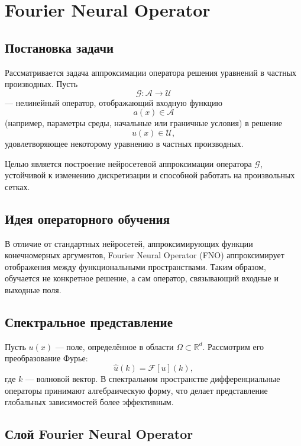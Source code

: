 \documentclass[12pt]{article}
\begin{document}
\section*{Fourier Neural Operator}

\subsection*{Постановка задачи}

Рассматривается задача аппроксимации оператора решения уравнений в частных производных. Пусть
\[
\mathcal{G} : \mathcal{A} \to \mathcal{U}
\]
— нелинейный оператор, отображающий входную функцию
\[
a(x) \in \mathcal{A}
\]
(например, параметры среды, начальные или граничные условия)
в решение
\[
u(x) \in \mathcal{U},
\]
удовлетворяющее некоторому уравнению в частных производных.

Целью является построение нейросетевой аппроксимации оператора $\mathcal{G}$, устойчивой к изменению дискретизации и способной работать на произвольных сетках.

\subsection*{Идея операторного обучения}

В отличие от стандартных нейросетей, аппроксимирующих функции конечномерных аргументов, Fourier Neural Operator (FNO) аппроксимирует отображения между функциональными пространствами. Таким образом, обучается не конкретное решение, а сам оператор, связывающий входные и выходные поля.

\subsection*{Спектральное представление}

Пусть $u(x)$ — поле, определённое в области $\Omega \subset \mathbb{R}^d$. Рассмотрим его преобразование Фурье:
\[
\hat{u}(k) = \mathcal{F}[u](k),
\]
где $k$ — волновой вектор. В спектральном пространстве дифференциальные операторы принимают алгебраическую форму, что делает представление глобальных зависимостей более эффективным.

\subsection*{Слой Fourier Neural Operator}
\end{document}
